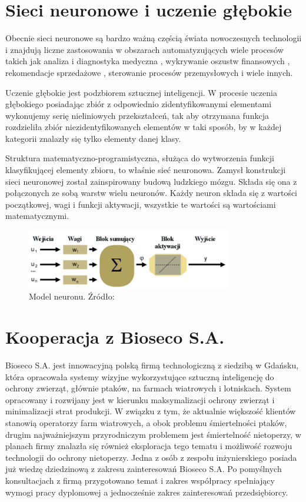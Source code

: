 \documentclass{sprz}
\begin{document}
\section{Sieci neuronowe i uczenie głębokie}
Obecnie sieci neuronowe są bardzo ważną częścią świata nowoczesnych technologii i znajdują liczne zastosowania w obszarach automatyzujących wiele procesów takich jak analiza i diagnostyka medyczna \cite{diabetes}, wykrywanie oszustw finansowych \cite{laundring}, rekomendacje sprzedażowe \cite{fashion}, sterowanie procesów przemysłowych \cite{irigation} i wiele innych.

Uczenie głębokie jest podzbiorem sztucznej inteligencji. W procesie uczenia głębokiego posiadając zbiór z odpowiednio zidentyfikowanymi elementami wykonujemy serię nieliniowych przekształceń, tak aby otrzymana funkcja rozdzieliła zbiór niezidentyfikowanych elementów w taki sposób, by w każdej kategorii znalazły się tylko elementy danej klasy.

Struktura matematyczno-programistyczna, służąca do wytworzenia funkcji klasyfikującej elementy zbioru, to właśnie sieć neuronowa. Zamysł konstrukcji sieci neuronowej został zainspirowany budową ludzkiego mózgu. Składa się ona z połączonych ze sobą warstw wielu neuronów. Każdy neuron składa się z wartości początkowej, wagi i funkcji aktywacji, wszystkie te wartości są wartościami matematycznymi. 

\begin{figure}[h]
  \centering
  \includegraphics[width=0.8\textwidth]{sprz/neuron}
  \caption{Model neuronu. Źródło: \cite{neuron}}
  \label{img:neuron}
\end{figure} 

\section{Kooperacja z Bioseco S.A.}
Bioseco S.A. jest innowacyjną polską firmą technologiczną z siedzibą w Gdańsku, która opracowała systemy wizyjne wykorzystujące sztuczną inteligencję do ochrony zwierząt, głównie ptaków, na farmach wiatrowych i lotniskach. System opracowany i rozwijany jest w kierunku maksymalizacji ochrony zwierząt i minimalizacji strat produkcji. W związku z tym, że aktualnie większość klientów stanowią operatorzy farm wiatrowych, a obok problemu śmiertelności ptaków, drugim najważniejszym przyrodniczym problemem jest śmiertelność nietoperzy, w planach firmy znalazła się również eksploracja tego tematu i możliwość rozwoju technologii do ochrony nietoperzy. Jedna z osób z zespołu inżynierskiego posiada już wiedzę dziedzinową z zakresu zainteresowań Bioseco S.A. Po pomyślnych konsultacjach z firmą przygotowano temat i zakres współpracy spełniający wymogi pracy dyplomowej a jednocześnie zakres zainteresowań przedsiębiorcy.
\end{document}
